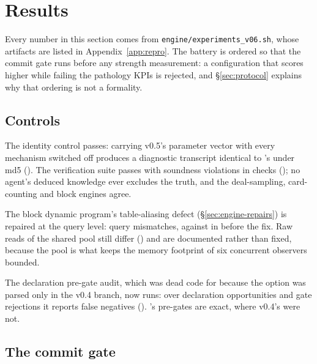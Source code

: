 \section{Results}
\label{sec:results}

Every number in this section comes from \texttt{engine/experiments\_v06.sh}, whose artifacts are
listed in Appendix~\ref{app:repro}. The battery is ordered so that the commit gate runs before any
strength measurement: a configuration that scores higher while failing the pathology KPIs is
rejected, and \S\ref{sec:protocol} explains why that ordering is not a formality.

\subsection{Controls}
\label{sec:results-verify}

The identity control passes: \vsix{} carrying v0.5's parameter vector with every mechanism switched
off produces a diagnostic transcript identical to \vfive{}'s under md5 (\vsixIdentity{}). The
verification suite passes with \vsixAuditViolations{} soundness violations in \vsixAuditChecks{}
checks (\vsixVerify{}); no agent's deduced knowledge ever excludes the truth, and the deal-sampling,
card-counting and block engines agree.

The block dynamic program's table-aliasing defect (\S\ref{sec:engine-repairs}) is repaired at the
query level: \vsixAliasQueryMismatch{} query mismatches, against \numAliasMismatch{} in
\numAliasChecks{} before the fix. Raw reads of the shared pool still differ
(\vsixAliasRawMismatch{}) and are documented rather than fixed, because the pool is what keeps the
memory footprint of six concurrent observers bounded.

The declaration pre-gate audit, which was dead code for \vfive{} because the option was parsed only
in the v0.4 branch, now runs: over \vsixGateOpportunities{} declaration opportunities and
\vsixGateRejected{} gate rejections it reports \vsixGateFalseNeg{} false negatives
(\vsixGateVerdict{}). \vfive{}'s pre-gates are exact, where v0.4's were not.

\subsection{The commit gate}
\label{sec:results-panel}

